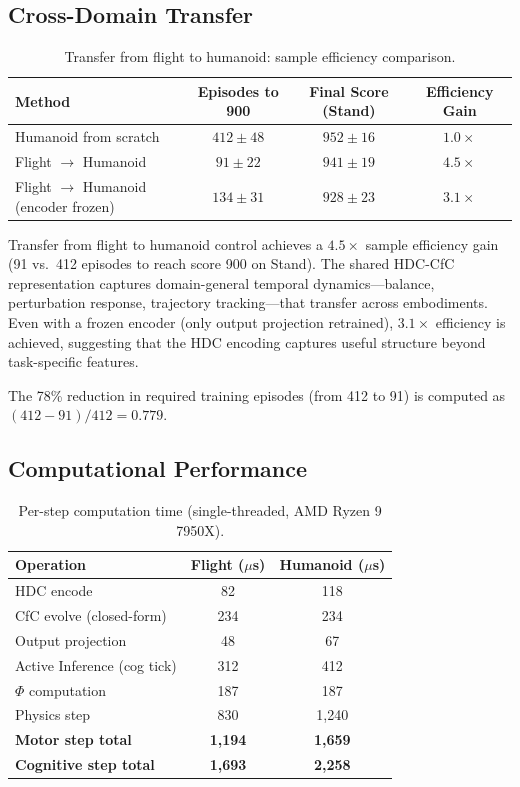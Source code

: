 \documentclass[11pt,a4paper]{article}
\begin{document}
\subsection{Cross-Domain Transfer}

\begin{table}[h]
\centering
\caption{Transfer from flight to humanoid: sample efficiency comparison.}
\label{tab:transfer}
\begin{tabular}{lccc}
\toprule
\textbf{Method} & \textbf{Episodes to 900} & \textbf{Final Score (Stand)} & \textbf{Efficiency Gain} \\
\midrule
Humanoid from scratch    & $412 \pm 48$ & $952 \pm 16$ & $1.0\times$ \\
Flight $\to$ Humanoid    & $91 \pm 22$  & $941 \pm 19$ & $4.5\times$ \\
Flight $\to$ Humanoid (encoder frozen) & $134 \pm 31$ & $928 \pm 23$ & $3.1\times$ \\
\bottomrule
\end{tabular}
\end{table}

Transfer from flight to humanoid control achieves a $4.5\times$ sample efficiency gain (91 vs.\ 412 episodes to reach score 900 on Stand).
The shared HDC-CfC representation captures domain-general temporal dynamics---balance, perturbation response, trajectory tracking---that transfer across embodiments.
Even with a frozen encoder (only output projection retrained), $3.1\times$ efficiency is achieved, suggesting that the HDC encoding captures useful structure beyond task-specific features.

The 78\% reduction in required training episodes (from 412 to 91) is computed as $(412 - 91)/412 = 0.779$.

\subsection{Computational Performance}

\begin{table}[h]
\centering
\caption{Per-step computation time (single-threaded, AMD Ryzen 9 7950X).}
\label{tab:timing}
\begin{tabular}{lcc}
\toprule
\textbf{Operation} & \textbf{Flight ($\mu$s)} & \textbf{Humanoid ($\mu$s)} \\
\midrule
HDC encode                  & 82   & 118  \\
CfC evolve (closed-form)    & 234  & 234  \\
Output projection           & 48   & 67   \\
Active Inference (cog tick) & 312  & 412  \\
$\Phi$ computation          & 187  & 187  \\
Physics step                & 830  & 1,240 \\
\midrule
\textbf{Motor step total}   & \textbf{1,194} & \textbf{1,659} \\
\textbf{Cognitive step total} & \textbf{1,693} & \textbf{2,258} \\
\bottomrule
\end{tabular}
\end{table}
\end{document}
